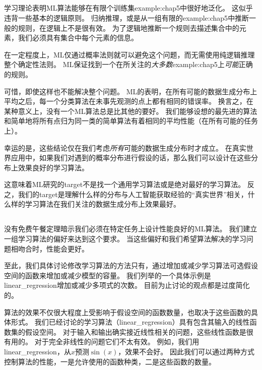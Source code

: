 \subsection{}
\label{sec:the_no_free_lunch_theorem}
学习理论表明\gls{ML}算法能够在有限个训练集\gls{example:chap5}中很好地泛化。
这似乎违背一些基本的逻辑原则。
归纳推理，或是从一组有限的\gls{example:chap5}中推断一般的规则，在逻辑上不是很有效。
为了逻辑地推断一个规则去描述集合中的元素，我们必须具有集合中每个元素的信息。

在一定程度上，\gls{ML}仅通过概率法则就可以避免这个问题，而无需使用纯逻辑推理整个确定性法则。
\gls{ML}保证找到一个在所关注的\emph{大多数}\gls{example:chap5}上\emph{可能}正确的规则。

可惜，即使这样也不能解决整个问题。
\gls{ML}的表明，在所有可能的数据生成分布上平均之后，每一个分类算法在未事先观测的点上都有相同的错误率。
换言之，在某种意义上，没有一个\gls{ML}算法总是比其他的要好。
我们能够设想的最先进的算法和简单地将所有点归为同一类的简单算法有着相同的平均性能（在所有可能的任务上）。


幸运的是，这些结论仅在我们考虑\emph{所有}可能的数据生成分布时才成立。
在真实世界应用中，如果我们对遇到的概率分布进行假设的话，那么我们可以设计在这些分布上效果良好的学习算法。

这意味着\gls{ML}研究的\gls{target}不是找一个通用学习算法或是绝对最好的学习算法。
反之，我们的\gls{target}是理解什么样的分布与人工智能获取经验的``真实世界''相关，什么样的学习算法在我们关注的数据生成分布上效果最好。

\subsection{}
\label{sec:regularization}
没有免费午餐定理暗示我们必须在特定任务上设计性能良好的\gls{ML}算法。
我们建立一组学习算法的偏好来达到这个要求。
当这些偏好和我们希望算法解决的学习问题相吻合时，性能会更好。

至此，我们具体讨论修改学习算法的方法只有，通过增加或减少学习算法可选假设空间的函数来增加或减少模型的容量。
我们列举的一个具体示例是\gls{linear_regression}增加或减少多项式的次数。
目前为止讨论的观点都是过度简化的。

算法的效果不仅很大程度上受影响于假设空间的函数数量，也取决于这些函数的具体形式。
我们已经讨论的学习算法（\gls{linear_regression}）具有包含其输入的线性函数集的假设空间。
对于输入和输出确实接近线性相关的问题，这些线性函数是很有用的。
对于完全非线性的问题它们不太有效。
例如，我们用\gls{linear_regression}，从$x$预测$\sin(x)$，效果不会好。
因此我们可以通过两种方式控制算法的性能，一是允许使用的函数种类，二是这些函数的数量。

